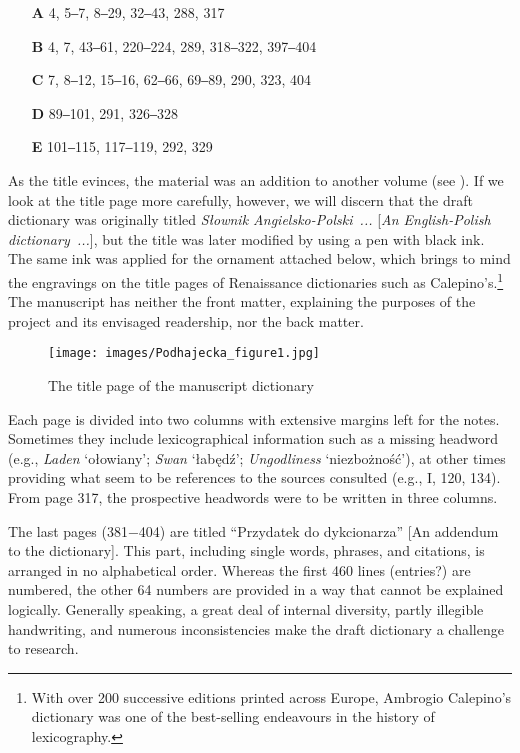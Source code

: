 \documentclass[output=paper,colorlinks,citecolor=brown,arabicfont,chinesefont]{langscibook}
\begin{document}
\begin{itemize}
    \item[\textbf{A}]  4, 5‒7, 8‒29, 32‒43, 288, 317
    \item[\textbf{B}]  4, 7, 43‒61, 220‒224, 289, 318‒322, 397‒404
    \item[\textbf{C}]  7, 8‒12, 15‒16, 62‒66, 69‒89, 290, 323, 404
    \item[\textbf{D}]  89‒101, 291, 326‒328
    \item[\textbf{E}]  101‒115, 117‒119, 292, 329
\end{itemize}

As the title evinces, the material was an addition to another volume (see ). If we look at the title page more carefully, however, we will discern that the draft dictionary was originally titled \emph{Słownik Angielsko-Polski~...} [\emph{An English-Polish dictionary~...}], but the title was later modified by using a pen with black ink. The same ink was applied for the ornament attached below, which brings to mind the engravings on the title pages of Renaissance dictionaries such as Calepino’s.\footnote{With over 200 successive editions printed across Europe, Ambrogio Calepino’s dictionary was one of the best-selling endeavours in the history of lexicography.} The manuscript has neither the front matter, explaining the purposes of the project and its envisaged readership, nor the back matter. 

\begin{figure}
\texttt{[image: images/Podhajecka\_figure1.jpg]}
\caption{The title page of the manuscript dictionary}
\label{pod:fig1}
\end{figure}

Each page is divided into two columns with extensive margins left for the notes. Sometimes they include lexicographical information such as a missing headword (e.g., \emph{Laden} ‘ołowiany’; \emph{Swan} ‘łabędź’; \emph{Ungodliness} ‘niezbożność’), at other times providing what seem to be references to the sources consulted (e.g., I, 120, 134). From page 317, the prospective headwords were to be written in three columns. 

The last pages (381−404) are titled “Przydatek do dykcionarza” [An addendum to the dictionary]. This part, including single words, phrases, and citations, is arranged in no alphabetical order. Whereas the first 460 lines (entries?) are numbered, the other 64 numbers are provided in a way that cannot be explained logically. Generally speaking, a great deal of internal diversity, partly illegible handwriting, and numerous inconsistencies make the draft dictionary a challenge to research. 
\end{document}
